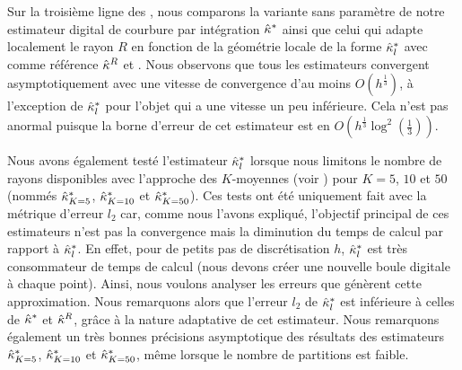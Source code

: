Sur la troisième ligne des
, nous
comparons la variante sans paramètre de notre estimateur digital de courbure par
intégration $\hat{\kappa}^{*}$ ainsi que celui qui adapte localement le rayon $R$ en
fonction de la géométrie locale de la forme $\hat{\kappa}^{*}_{l}$ avec comme référence
$\hat{\kappa}^{R}$ et \MDCA. Nous observons que tous les estimateurs convergent
asymptotiquement avec une vitesse de convergence d'au moins $O(h^\frac{1}{3})$, à
l'exception de $\hat{\kappa}^{*}_{l}$ pour l'objet \Ellipse qui a une vitesse un peu
inférieure. Cela n'est pas anormal puisque la borne d'erreur de cet estimateur
est en $O\left(h^\frac{1}{3} \log^2\left(\frac{1}{3}\right)\right)$.


Nous avons également testé l'estimateur $\hat{\kappa}^{*}_{l}$ lorsque nous limitons le
nombre de rayons disponibles avec l'approche des $K$-moyennes (voir
) pour $K = 5$, $10$ et $50$
(nommés $\hat{\kappa}^{*}_{K=5}$, $\hat{\kappa}^{*}_{K=10}$ et $\hat{\kappa}^{*}_{K=50}$). Ces tests ont été
uniquement fait avec la métrique d'erreur $l_2$ car, comme nous l'avons
expliqué, l'objectif principal de ces estimateurs n'est pas la convergence mais
la diminution du temps de calcul par rapport à $\hat{\kappa}^{*}_{l}$. En effet, pour de
petits pas de discrétisation $h$, $\hat{\kappa}^{*}_{l}$ est très consommateur de temps de
calcul (nous devons créer une nouvelle boule digitale à chaque point). Ainsi,
nous voulons analyser les erreurs que génèrent cette approximation. Nous
remarquons alors que l'erreur $l_2$ de $\hat{\kappa}^{*}_{l}$ est inférieure à celles de
$\hat{\kappa}^{*}$ et $\hat{\kappa}^{R}$, grâce à la nature adaptative de cet estimateur. Nous
remarquons également un très bonnes précisions asymptotique des résultats des
estimateurs $\hat{\kappa}^{*}_{K=5}$, $\hat{\kappa}^{*}_{K=10}$ et $\hat{\kappa}^{*}_{K=50}$, même lorsque le
nombre de partitions est faible.
%
